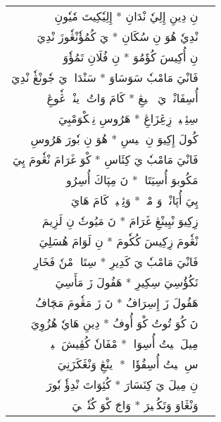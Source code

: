\documentclass[a4paper, 12pt]{report}
\begin{document}
\begin{longtable}{rl}
\textarabic{نِ دِينِ إِلِيٗ نْدَانِ  *  إِلِيٗكِيتَ مٗيٗونِ} & \\ 
\textarabic{نْدِيٗ هُوَ نِ سُكَانِ  *  يَ كُمُؤٗنْڠٗوزَ نْدِيَ} & \\ 
[8mm] 

\textarabic{نِ أُكِيسَ كُؤَمُوَ  *  نِ فُلَانِ تَمُؤٗوَ} & \\ 
\textarabic{فَانْيَ مَامْبٗ سَوَسَاوَ  *  سَنْدَامٖ يَ جٗونْڠٗ نْدِيَ} & \\ 
[8mm] 

\textarabic{أُسِفَانْيٖ يَ شٖشٖيڠِ  *  كَامَ وَاتُ وٖينْيٖ ڠٗوڠِ} & \\ 
\textarabic{سِئِپٖيكٖ زِڠِزَاڠِ  *  هَرُوسِ نِمٖكْوَمْبِيَ} & \\ 
[8mm] 

\textarabic{كُولَ إِكِيوَ نِ پٖيسِ  *  هُوَ نِ بٗورَ هَرُوسِ} & \\ 
\textarabic{فَانْيَ مَامْبٗ يَ كِئَاسِ  *  كْوَ غَرَامَ نْڠٗومَ پِيَ} & \\ 
[8mm] 

\textarabic{مَكُوبوَ أُسِيَتَاكٖ  *  نَ مِپَاكَ أُسِرُوكٖ} & \\ 
\textarabic{پِيَ أُپَانْدٖ وَ مْكٖ  *  وَئِلٖيزٖ كَامَ هَايَ} & \\ 
[8mm] 

\textarabic{زِكِيوَ نْيِينْڠِ غَرَامَ  *  نَ مَيُوتٗ نِ لَزِيمَ} & \\ 
\textarabic{نْڠٗومَ زِكِيسَ كُكٗومَ  *  نِ لَوَامَ هُسَلِيَ} & \\ 
[8mm] 

\textarabic{فَانْيَ مَامْبٗ يَ كَدِيرِ  *  سِتَاكٖ مْنٗ فَخَارِ} & \\ 
\textarabic{نَكُؤُسِيَ سِكِيرِ  *  هَفُولَ زَ مَأَسِيَ} & \\ 
[8mm] 

\textarabic{هَفُولَ زَ إِسِرَافُ  *  نَ زَ مَڠٗومَ مَچَافُ} & \\ 
\textarabic{نَ كُوَ تُوتُ كْوَ أُوفُ  * دِينِ هَايٗ هُزُوِيَ} & \\ 
[8mm] 

\textarabic{مِيلَ يٖيتُ أُسِوَاتٖ  *  مْفَانٗ كُڤِيشَ پٖيتٖ} & \\ 
\textarabic{سِ يٖيتُ أُسِفُؤَاتٖ  *  وٖينْڠِ وَنْڠَكَزَنِيَ} & \\ 
[8mm] 

\textarabic{نِ مِيلَ يَ كِنَسَارَ  *  كُئِوَاتَ نْدِؤٗ بٗورَ} & \\ 
\textarabic{وَنْڠَاوَ وَتَكُكٖيرَ  *  وَاجَ كْوَ كُتٗئٖلٖيَ} & \\ 
[8mm] 


\end{longtable}
\end{document}

